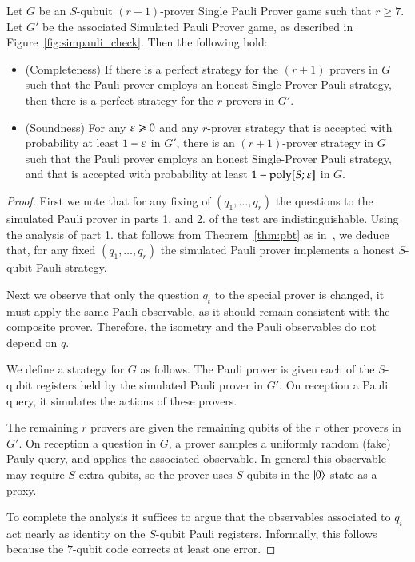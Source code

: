 \begin{theorem}
Let $G$ be an $S$-qubuit $(r+1)$-prover Single Pauli Prover game such that $r\geq 7$. Let $G'$ be the associated Simulated Pauli Prover game, as described in Figure~\ref{fig:simpauli_check}. Then the following hold:
\begin{itemize}
\item (Completeness) If there is a perfect strategy for the $(r+1)$ provers in $G$ such that the Pauli prover employs an honest Single-Prover Pauli strategy, then there is a perfect strategy for the $r$ provers in $G'$. 
\item (Soundness) For any $\varepsilon\geqslant 0$ and any $r$-prover strategy that is accepted with probability at least $1-\varepsilon$ in $G'$, there is an $(r+1)$-prover strategy in $G$ such that the Pauli prover employs an honest Single-Prover Pauli strategy, and that is accepted with probability at least $1-\operatorname{poly}[S;\varepsilon]$ in $G$.
\end{itemize}
\end{theorem}

\begin{proof}
First we note that for any fixing of $(q_1,\ldots,q_r)$ the questions to the simulated Pauli prover in parts 1. and 2. of the test are indistinguishable. Using the analysis of part 1. that follows from Theorem~\ref{thm:pbt} as in~\cite{}, we deduce that, for any fixed $(q_1,\ldots,q_r)$ the simulated Pauli prover implements a honest $S$-qubit Pauli strategy. 

Next we observe that only the question $q_t$ to the special prover is changed, it must apply the same Pauli observable, as it should remain consistent with the composite prover. Therefore, the isometry and the Pauli observables do not depend on $q$. 

We define a strategy for $G$ as follows. The Pauli prover is given each of the $S$-qubit registers held by the simulated Pauli prover in $G'$. On reception a Pauli query, it simulates the actions of these provers. 

The remaining $r$ provers are given the remaining qubits of the $r$ other provers in $G'$. On reception a question in $G$, a prover samples a uniformly random (fake) Pauly query, and applies the associated observable. In general this observable may require $S$ extra qubits, so the prover uses $S$ qubits in the $|0\rangle$ state as a proxy. 

To complete the analysis it suffices to argue that the observables associated to $q_i$ act nearly as identity on the $S$-qubit Pauli registers. Informally, this follows because the $7$-qubit code corrects at least one error.
\end{proof}